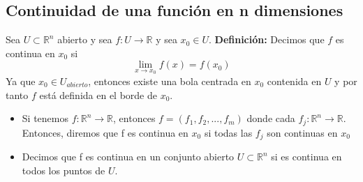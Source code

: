 \documentclass[11pt]{article}
\newcommand{\R}{\mathbb{R}}
\theoremstyle{plain}
\begin{document}
        \subsection{Continuidad de una función en n dimensiones} %
        \label{sub:continuidad_de_una_función_en_n_dimensiones}
            Sea $U \subset \R^n $ abierto y sea $f:U \rightarrow \R$ y sea $x_0 \in U$.
            \textbf{Definición:} Decimos que $f$ es continua en $x_0$ si \[\lim_{x\to x_0} f(x) = f(x_0)\]
            Ya que $x_0 \in U_{abierto}$, entonces existe una bola centrada en $x_0$ contenida en $U$ y por tanto $f$ está definida en el borde de $x_0$. 
            \begin{itemize}
                \item Si tenemos $f:\R^n \rightarrow \R$, entonces $f= (f_1,f_2,...,f_m)$ donde cada $f_j: \R^n \rightarrow \R$. Entonces, diremos que f es continua en $x_0$ si todas las $f_j$ son continuas en $x_0$
                \item Decimos que f es continua en un conjunto abierto $U \subset \R^n$ si es continua en todos los puntos de $U$.
            \end{itemize}
\end{document}
